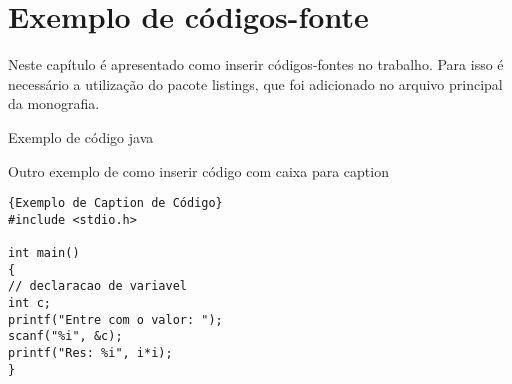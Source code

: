 \chapter{Exemplo de códigos-fonte}

Neste capítulo é apresentado como inserir códigos-fontes no trabalho. Para isso é necessário a utilização do pacote listings, que foi adicionado no arquivo principal da monografia.

Exemplo de código java


\lstset{language=java}



\pagebreak
Outro exemplo de como inserir código com caixa para caption

\begin{lstlisting}{Exemplo de Caption de Código}
#include <stdio.h>

int main()
{
// declaracao de variavel
int c;
printf("Entre com o valor: ");
scanf("%i", &c);
printf("Res: %i", i*i);
}
\end{lstlisting}